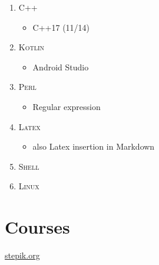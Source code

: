 \documentclass[]{report}
\begin{document}
\begin{enumerate}

\item {
	\textsc{C++}
	\begin{itemize}
		\item {C++17 (11/14)}
	\end{itemize}
}

\item {
	\textsc{Kotlin}
	\begin{itemize}
		\item {Android Studio}
	\end{itemize}
}

\item {\textsc{Perl}
	\begin{itemize}
		\item {Regular expression}
	\end{itemize}
}

\item {
	\textsc{Latex}
	\begin{itemize}
		\item {also Latex insertion in Markdown}   
	\end{itemize}	   		
}

\item {\textsc{Shell}}

\item {\textsc{Linux}}


\end{enumerate}

\section*{\Large Courses}
	 \href{https://stepik.org/users/20189089/certificates}{stepik.org}
\end{document}
